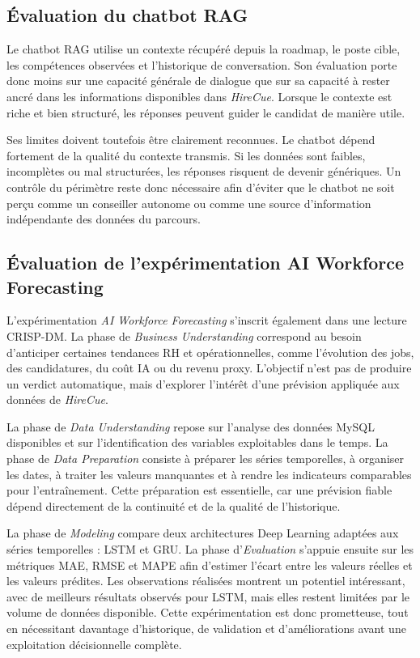 \subsection{Évaluation du chatbot RAG}

Le chatbot RAG utilise un contexte récupéré depuis la roadmap, le poste cible, les compétences observées et l'historique de conversation. Son évaluation porte donc moins sur une capacité générale de dialogue que sur sa capacité à rester ancré dans les informations disponibles dans \textit{HireCue}. Lorsque le contexte est riche et bien structuré, les réponses peuvent guider le candidat de manière utile.

Ses limites doivent toutefois être clairement reconnues. Le chatbot dépend fortement de la qualité du contexte transmis. Si les données sont faibles, incomplètes ou mal structurées, les réponses risquent de devenir génériques. Un contrôle du périmètre reste donc nécessaire afin d'éviter que le chatbot ne soit perçu comme un conseiller autonome ou comme une source d'information indépendante des données du parcours.

\subsection{Évaluation de l'expérimentation AI Workforce Forecasting}

L'expérimentation \textit{AI Workforce Forecasting} s'inscrit également dans une lecture CRISP-DM. La phase de \textit{Business Understanding} correspond au besoin d'anticiper certaines tendances RH et opérationnelles, comme l'évolution des jobs, des candidatures, du coût IA ou du revenu proxy. L'objectif n'est pas de produire un verdict automatique, mais d'explorer l'intérêt d'une prévision appliquée aux données de \textit{HireCue}.

La phase de \textit{Data Understanding} repose sur l'analyse des données MySQL disponibles et sur l'identification des variables exploitables dans le temps. La phase de \textit{Data Preparation} consiste à préparer les séries temporelles, à organiser les dates, à traiter les valeurs manquantes et à rendre les indicateurs comparables pour l'entraînement. Cette préparation est essentielle, car une prévision fiable dépend directement de la continuité et de la qualité de l'historique.

La phase de \textit{Modeling} compare deux architectures Deep Learning adaptées aux séries temporelles : LSTM et GRU. La phase d'\textit{Evaluation} s'appuie ensuite sur les métriques MAE, RMSE et MAPE afin d'estimer l'écart entre les valeurs réelles et les valeurs prédites. Les observations réalisées montrent un potentiel intéressant, avec de meilleurs résultats observés pour LSTM, mais elles restent limitées par le volume de données disponible. Cette expérimentation est donc prometteuse, tout en nécessitant davantage d'historique, de validation et d'améliorations avant une exploitation décisionnelle complète.

